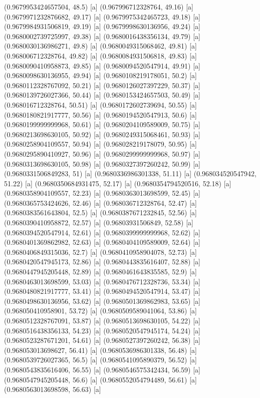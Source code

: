 {{{(0.9679953424657504, 48.5) [a] 
(0.967996712328764, 49.16) [a] 
(0.9679971232876682, 49.17) [a] 
(0.9679975342465723, 49.18) [a] 
(0.9679984931506819, 49.19) [a] 
(0.9679998630136956, 49.24) [a] 
(0.9680002739725997, 49.38) [a] 
(0.9680016438356134, 49.79) [a] 
(0.9680030136986271, 49.8) [a] 
(0.9680049315068462, 49.81) [a] 
(0.968006712328764, 49.82) [a] 
(0.9680084931506818, 49.83) [a] 
(0.9680090410958873, 49.85) [a] 
(0.9680094520547914, 49.91) [a] 
(0.9680098630136955, 49.94) [a] 
(0.9680108219178051, 50.2) [a] 
(0.9680112328767092, 50.21) [a] 
(0.9680126027397229, 50.37) [a] 
(0.9680139726027366, 50.44) [a] 
(0.9680153424657503, 50.49) [a] 
(0.968016712328764, 50.51) [a] 
(0.9680172602739694, 50.55) [a] 
(0.9680180821917777, 50.56) [a] 
(0.9680194520547913, 50.6) [a] 
(0.9680199999999968, 50.61) [a] 
(0.9680204109589009, 50.75) [a] 
(0.9680213698630105, 50.92) [a] 
(0.9680249315068461, 50.93) [a] 
(0.9680258904109557, 50.94) [a] 
(0.968028219178079, 50.95) [a] 
(0.9680295890410927, 50.96) [a] 
(0.9680299999999968, 50.97) [a] 
(0.9680313698630105, 50.98) [a] 
(0.9680327397260242, 50.99) [a] 
(0.9680331506849283, 51) [a] 
(0.9680336986301338, 51.11) [a] 
(0.968034520547942, 51.22) [a] 
(0.9680350684931475, 52.17) [a] 
(0.9680354794520516, 52.18) [a] 
(0.9680358904109557, 52.23) [a] 
(0.9680363013698599, 52.45) [a] 
(0.9680365753424626, 52.46) [a] 
(0.968036712328764, 52.47) [a] 
(0.9680383561643804, 52.5) [a] 
(0.9680387671232845, 52.56) [a] 
(0.9680390410958872, 52.57) [a] 
(0.96803931506849, 52.58) [a] 
(0.9680394520547914, 52.61) [a] 
(0.9680399999999968, 52.62) [a] 
(0.9680401369862982, 52.63) [a] 
(0.9680404109589009, 52.64) [a] 
(0.9680406849315036, 52.7) [a] 
(0.9680410958904078, 52.73) [a] 
(0.9680420547945173, 52.86) [a] 
(0.9680443835616407, 52.88) [a] 
(0.9680447945205448, 52.89) [a] 
(0.9680461643835585, 52.9) [a] 
(0.9680463013698599, 53.03) [a] 
(0.9680476712328736, 53.34) [a] 
(0.9680480821917777, 53.41) [a] 
(0.9680494520547914, 53.47) [a] 
(0.9680498630136956, 53.62) [a] 
(0.9680501369862983, 53.65) [a] 
(0.968050410958901, 53.72) [a] 
(0.9680509589041064, 53.86) [a] 
(0.9680512328767091, 53.87) [a] 
(0.9680513698630105, 54.22) [a] 
(0.9680516438356133, 54.23) [a] 
(0.9680520547945174, 54.24) [a] 
(0.9680523287671201, 54.61) [a] 
(0.9680527397260242, 56.38) [a] 
(0.968053013698627, 56.41) [a] 
(0.9680536986301338, 56.48) [a] 
(0.9680539726027365, 56.5) [a] 
(0.9680541095890379, 56.52) [a] 
(0.9680543835616406, 56.55) [a] 
(0.9680546575342434, 56.59) [a] 
(0.9680547945205448, 56.6) [a] 
(0.9680552054794489, 56.61) [a] 
(0.9680563013698598, 56.63) [a] 
}}}
